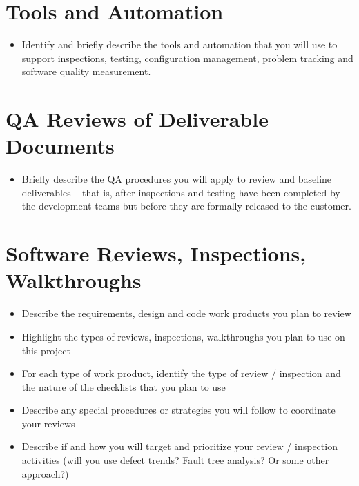 \documentclass[11pt]{report}
\begin{document}
\chapter{Tools and Automation}
\begin{itemize}
\item Identify and briefly describe the tools and automation that you will use to support
  inspections, testing, configuration management, problem tracking and software quality measurement.
\end{itemize}



\chapter{QA Reviews of Deliverable Documents}
\begin{itemize}
\item Briefly describe the QA procedures you will apply to review and baseline deliverables – that
  is, after inspections and testing have been completed by the development teams but before they are
  formally released to the customer.
\end{itemize}



\chapter{Software Reviews, Inspections, Walkthroughs}
\begin{itemize}
\item Describe the requirements, design and code work products you plan to review
\item Highlight the types of reviews, inspections, walkthroughs you plan to use on this project
\item For each type of work product, identify the type of review / inspection and the nature of the
  checklists that you plan to use
\item Describe any special procedures or strategies you will follow to coordinate your reviews
\item Describe if and how you will target and prioritize your review / inspection activities (will
  you use defect trends? Fault tree analysis? Or some other approach?)
\end{itemize}
\end{document}
